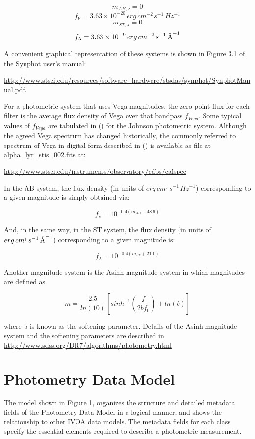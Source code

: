 \documentclass[11pt,a4paper]{ivoa}
\newcommand{\angstrom}{\mbox{\normalfont\AA}}
\begin{document}
\[
m_{AB,\nu } = 0
\]
\[
f_\nu = 3.63\times 10^{-20}\,erg\,cm^{-2}\,s^{-1}\,Hz^{-1}
\]
\[
m_{ST,\lambda } = 0
\]
\[
f_\lambda = 3.63\times 10^{-9}\,erg\,cm^{-2}\,s^{-1}\,\angstrom^{-1}
\]


A convenient graphical representation of these systems is shown in Figure 3.1 of the Synphot user’s manual:
\par

\url{http://www.stsci.edu/resources/software_hardware/stsdas/synphot/SynphotManual.pdf}.
\par

For a photometric system that uses Vega magnitudes, the zero point flux for each filter is the average flux density of Vega over that bandpass $f_{Vega}$. Some typical values of $f_{Vega}$ are tabulated in (\cite{2001eaa..book.....M}) for the Johnson photometric system. Although the agreed Vega spectrum has changed historically, the commonly referred to spectrum of Vega in digital form described in (\cite{2004AJ....127.3508B}) is available as file at alpha\_lyr\_stis\_002.fits at:\par
\url{http://www.stsci.edu/instruments/observatory/cdbs/calspec}
\par

In the AB system, the flux density (in units of $erg\, cm^{_2}\, s^{-1}\, Hz^{-1}$) corresponding to a given magnitude is simply obtained via:
\par
\[
f_{\nu} = 10^{-0.4(m_{AB}+48.6)}
\]

And, in the same way, in the ST system, the flux density (in units of $erg\, cm^{_2}\, s^{-1}\, \angstrom^{-1}$) corresponding to a given magnitude is:
\par
\[
f_{\lambda} = 10^{-0.4(m_{ST}+21.1)}
\]

Another magnitude system is the Asinh magnitude system in which magnitudes are defined as
\par
\[
m = \frac{2.5}{ln(10)} \left[ sinh^{-1}(\frac{f}{2bf_0}) +ln(b) \right]
\]


where b is known as the softening parameter. Details of the Asinh magnitude system and the softening parameters are described in \url{http://www.sdss.org/DR7/algorithms/photometry.html}
\par

\section{Photometry Data Model} \label{datamodel}
The model shown in Figure 1, organizes the structure and detailed metadata fields of the Photometry Data Model in a logical manner, and shows the relationship to other IVOA data models. The metadata fields for each class specify the essential elements required to describe a photometric measurement.
\par
\end{document}
